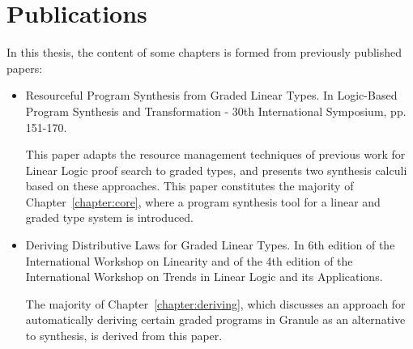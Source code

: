 \chapter*{Publications}

In this thesis, the content of some chapters is formed from
previously published papers:
\begin{itemize}
    \item \citet{DBLP:conf/lopstr/HughesO20} Resourceful Program Synthesis from
    Graded Linear Types. In Logic-Based Program Synthesis and Transformation -
    30th International Symposium, pp. 151-170. 
    
    This paper adapts the resource management techniques of previous work for
    Linear Logic proof search to graded types, and presents two synthesis
    calculi based on these approaches. This paper constitutes the majority of
    Chapter~\ref{chapter:core}, where a program synthesis tool for a linear and
    graded type system is introduced. 

    \item \citet{DBLP:journals/corr/abs-2112-14966} Deriving Distributive Laws
    for Graded Linear Types. In 6th edition of the International Workshop on
    Linearity and of the 4th edition of the International Workshop on Trends in
    Linear Logic and its Applications. 

    The majority of Chapter~\ref{chapter:deriving}, which discusses an approach
    for automatically deriving certain graded programs in Granule as an
    alternative to synthesis, is derived from this paper. 
\end{itemize}
